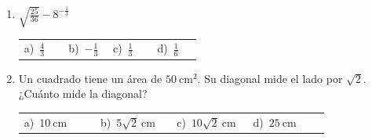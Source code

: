 \documentclass[11pt,a4paper]{article}
\begin{document}
\begin{enumerate}[label=\textbf{\arabic*.},leftmargin=*,itemsep=11pt,topsep=0pt]
\item \begin{minipage}[t]{\linewidth}
$\displaystyle \sqrt{\frac{25}{36}}-8^{-\frac{1}{3}}$

\vspace{5pt}
\begin{tabular}{@{}p{0.23\linewidth}p{0.23\linewidth}p{0.23\linewidth}p{0.23\linewidth}@{}}
a)~$\displaystyle \frac{4}{3}$ & b)~$\displaystyle -\frac{1}{3}$ & c)~$\displaystyle \frac{1}{3}$ & d)~$\displaystyle \frac{1}{6}$ \\
\end{tabular}
\end{minipage}

\item \begin{minipage}[t]{\linewidth}
Un cuadrado tiene un área de $50\ \text{cm}^{2}$. Su diagonal mide el lado por $\sqrt{2}$. ¿Cuánto mide la diagonal?

\vspace{5pt}
\begin{tabular}{@{}p{0.23\linewidth}p{0.23\linewidth}p{0.23\linewidth}p{0.23\linewidth}@{}}
a)~$\displaystyle 10\ \text{cm}$ & b)~$\displaystyle 5\sqrt{2}\ \text{cm}$ & c)~$\displaystyle 10\sqrt{2}\ \text{cm}$ & d)~$\displaystyle 25\ \text{cm}$ \\
\end{tabular}
\end{minipage}
\end{enumerate}
\end{document}
